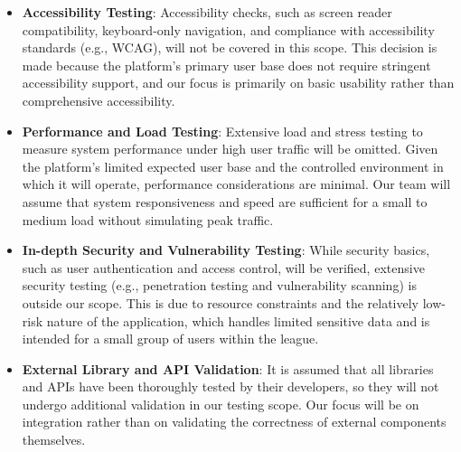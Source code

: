 \documentclass[12pt, titlepage]{article}
\begin{document}
\begin{itemize}
    \item \textbf{Accessibility Testing}: Accessibility checks, such as screen reader compatibility, keyboard-only navigation, and compliance with accessibility standards (e.g., WCAG), will not be covered in this scope. This decision is made because the platform’s primary user base does not require stringent accessibility support, and our focus is primarily on basic usability rather than comprehensive accessibility.
    
    \item \textbf{Performance and Load Testing}: Extensive load and stress testing to measure system performance under high user traffic will be omitted. Given the platform's limited expected user base and the controlled environment in which it will operate, performance considerations are minimal. Our team will assume that system responsiveness and speed are sufficient for a small to medium load without simulating peak traffic.
    
    \item \textbf{In-depth Security and Vulnerability Testing}: While security basics, such as user authentication and access control, will be verified, extensive security testing (e.g., penetration testing and vulnerability scanning) is outside our scope. This is due to resource constraints and the relatively low-risk nature of the application, which handles limited sensitive data and is intended for a small group of users within the league.
    
    \item \textbf{External Library and API Validation}: It is assumed that all libraries and APIs have been thoroughly tested by their developers, so they will not undergo additional validation in our testing scope. Our focus will be on integration rather than on validating the correctness of external components themselves.
\end{itemize}



\end{document}
